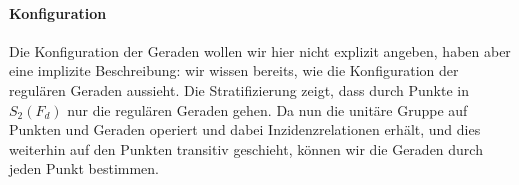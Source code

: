 \paragraph{Konfiguration} Die Konfiguration der Geraden wollen wir hier nicht explizit angeben, haben aber eine implizite Beschreibung: wir wissen bereits, wie die Konfiguration der regulären Geraden aussieht. Die Stratifizierung zeigt, dass durch Punkte in $S_2(F_d)$ nur die regulären Geraden gehen. Da nun die unitäre Gruppe auf Punkten und Geraden operiert und dabei Inzidenzrelationen erhält, und dies weiterhin auf den Punkten transitiv geschieht, können wir die Geraden durch jeden Punkt bestimmen.
